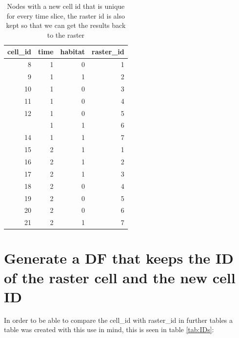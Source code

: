\documentclass[]{article}
\newenvironment{Shaded}{\begin{snugshade}}{\end{snugshade}}
\newcommand{\DataTypeTok}[1]{\textcolor[rgb]{0.13,0.29,0.53}{#1}}
\newcommand{\KeywordTok}[1]{\textcolor[rgb]{0.13,0.29,0.53}{\textbf{#1}}}
\newcommand{\NormalTok}[1]{#1}
\newcommand{\OperatorTok}[1]{\textcolor[rgb]{0.81,0.36,0.00}{\textbf{#1}}}
\newcommand{\StringTok}[1]{\textcolor[rgb]{0.31,0.60,0.02}{#1}}
\begin{document}
\begin{table}[!h]

\caption{\label{tab:A}Nodes with a new cell id that is unique for every time slice, the raster id is also kept so that we can get the results back to the raster}
\centering
\begin{tabular}[t]{rrrr}
\toprule
cell\_id & time & habitat & raster\_id\\
\midrule
\rowcolor{gray!6}  8 & 1 & 0 & 1\\
9 & 1 & 1 & 2\\
\rowcolor{gray!6}  10 & 1 & 0 & 3\\
11 & 1 & 0 & 4\\
\rowcolor{gray!6}  12 & 1 & 0 & 5\\
\addlinespace
13 & 1 & 1 & 6\\
\rowcolor{gray!6}  14 & 1 & 1 & 7\\
15 & 2 & 1 & 1\\
\rowcolor{gray!6}  16 & 2 & 1 & 2\\
17 & 2 & 1 & 3\\
\addlinespace
\rowcolor{gray!6}  18 & 2 & 0 & 4\\
19 & 2 & 0 & 5\\
\rowcolor{gray!6}  20 & 2 & 0 & 6\\
21 & 2 & 1 & 7\\
\bottomrule
\end{tabular}
\end{table}

\hypertarget{generate-a-df-that-keeps-the-id-of-the-raster-cell-and-the-new-cell-id}{%
\section{Generate a DF that keeps the ID of the raster cell and the new cell ID}\label{generate-a-df-that-keeps-the-id-of-the-raster-cell-and-the-new-cell-id}}

In order to be able to compare the cell\_id with raster\_id in further tables a table was created with this use in mind, this is seen in table \ref{tab:IDs}:

\begin{Shaded}
\end{Shaded}
\end{document}
